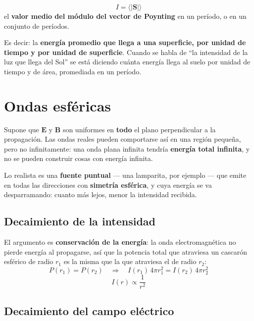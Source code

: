 \documentclass[12pt,a4paper]{article}
\begin{document}
\begin{keybox}[Intensidad]
\[
\boxed{\ I = \langle |\mathbf{S}| \rangle \ }
\]
el \textbf{valor medio del módulo del vector de Poynting} en un período, o en un
conjunto de períodos.
\end{keybox}

Es decir: la \textbf{energía promedio que llega a una superficie, por unidad de
tiempo y por unidad de superficie}. Cuando se habla de \enquote{la intensidad de
la luz que llega del Sol} se está diciendo cuánta energía llega al suelo por
unidad de tiempo y de área, promediada en un período.

\section{Ondas esféricas}

\begin{warnbox}
Supone que $\mathbf{E}$ y $\mathbf{B}$ son uniformes en \textbf{todo} el plano
perpendicular a la propagación. Las ondas reales pueden comportarse así en una
región pequeña, pero no infinitamente: una onda plana infinita tendría
\textbf{energía total infinita}, y no se pueden construir cosas con energía
infinita.
\end{warnbox}

Lo realista es una \textbf{fuente puntual} --- una lamparita, por ejemplo --- que
emite en todas las direcciones con \textbf{simetría esférica}, y cuya energía se
va desparramando: cuanto más lejos, menor la intensidad recibida.

\subsection{Decaimiento de la intensidad}

El argumento es \textbf{conservación de la energía}: la onda electromagnética no
pierde energía al propagarse, así que la potencia total que atraviesa un cascarón
esférico de radio $r_1$ es la misma que la que atraviesa el de radio $r_2$:
\[
P(r_1) = P(r_2)
\quad\Longrightarrow\quad
I(r_1)\,4\pi r_1^2 = I(r_2)\,4\pi r_2^2
\]
\[
\boxed{\ I(r) \propto \frac{1}{r^2}\ }
\]

\subsection{Decaimiento del campo eléctrico}
\end{document}

